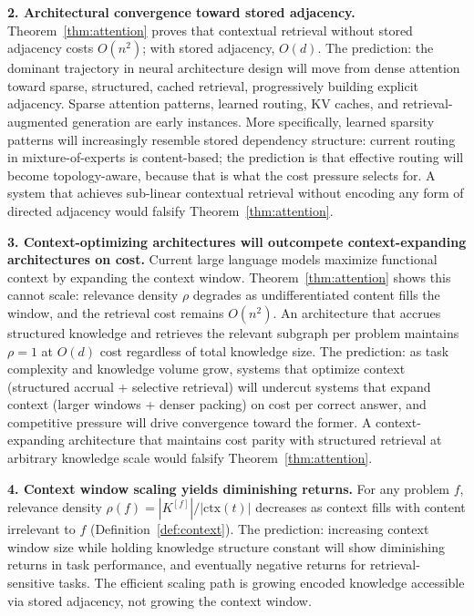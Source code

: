 \documentclass[11pt]{article}
\theoremstyle{definition}
\begin{document}
\textbf{2. Architectural convergence toward stored adjacency.}
Theorem~\ref{thm:attention} proves that contextual retrieval without
stored adjacency costs $O(n^2)$; with stored adjacency, $O(d)$. The
prediction: the dominant trajectory in neural architecture design will
move from dense attention toward sparse, structured, cached retrieval,
progressively building explicit adjacency. Sparse attention patterns,
learned routing, KV caches, and retrieval-augmented generation are early
instances. More specifically, learned sparsity patterns will
increasingly resemble stored dependency structure: current routing in
mixture-of-experts is content-based; the prediction is that effective
routing will become topology-aware, because that is what the cost
pressure selects for. A system that achieves sub-linear contextual
retrieval without encoding any form of directed adjacency would falsify
Theorem~\ref{thm:attention}.

\textbf{3. Context-optimizing architectures will outcompete
context-expanding architectures on cost.}
Current large language models maximize functional context by expanding
the context window. Theorem~\ref{thm:attention} shows this cannot
scale: relevance density $\rho$ degrades as undifferentiated content
fills the window, and the retrieval cost remains $O(n^2)$. An
architecture that accrues structured knowledge and retrieves the
relevant subgraph per problem maintains $\rho = 1$ at $O(d)$ cost
regardless of total knowledge size. The prediction: as task complexity
and knowledge volume grow, systems that optimize context (structured
accrual + selective retrieval) will undercut systems that expand context
(larger windows + denser packing) on cost per correct answer, and
competitive pressure will drive convergence toward the former. A
context-expanding architecture that maintains cost parity with
structured retrieval at arbitrary knowledge scale would falsify
Theorem~\ref{thm:attention}.

\textbf{4. Context window scaling yields diminishing returns.}
For any problem $f$, relevance density
$\rho(f) = |K^{[f]}| / |\mathrm{ctx}(t)|$ decreases as context fills
with content irrelevant to $f$ (Definition~\ref{def:context}). The
prediction: increasing context window size while holding knowledge
structure constant will show diminishing returns in task performance,
and eventually negative returns for retrieval-sensitive tasks. The
efficient scaling path is growing encoded knowledge accessible via
stored adjacency, not growing the context window.
\end{document}
